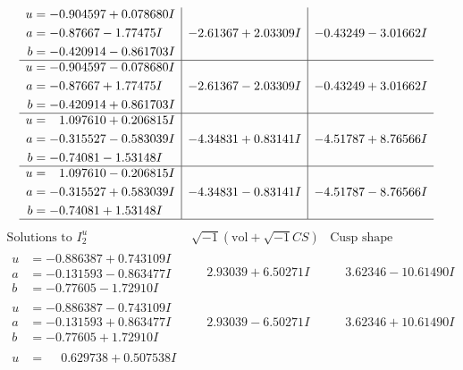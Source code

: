 \documentclass[1p]{elsarticle_modified}
\theoremstyle{definition}
\newcommand{\I}{\sqrt{-1}}
\begin{document}
$$\begin{array}{c|c|c}
\begin{aligned}
u &= -0.904597 + 0.078680 I \\
a &= -0.87667 - 1.77475 I \\
b &= -0.420914 - 0.861703 I\end{aligned}
 & -2.61367 + 2.03309 I & -0.43249 - 3.01662 I \\ \hline\begin{aligned}
u &= -0.904597 - 0.078680 I \\
a &= -0.87667 + 1.77475 I \\
b &= -0.420914 + 0.861703 I\end{aligned}
 & -2.61367 - 2.03309 I & -0.43249 + 3.01662 I \\ \hline\begin{aligned}
u &= \phantom{-}1.097610 + 0.206815 I \\
a &= -0.315527 - 0.583039 I \\
b &= -0.74081 - 1.53148 I\end{aligned}
 & -4.34831 + 0.83141 I & -4.51787 + 8.76566 I \\ \hline\begin{aligned}
u &= \phantom{-}1.097610 - 0.206815 I \\
a &= -0.315527 + 0.583039 I \\
b &= -0.74081 + 1.53148 I\end{aligned}
 & -4.34831 - 0.83141 I & -4.51787 - 8.76566 I\\
 \hline 
 \end{array}$$\newpage$$\begin{array}{c|c|c}  
\text{Solutions to }I^u_{2}& \I (\text{vol} + \sqrt{-1}CS) & \text{Cusp shape}\\
 \hline 
\begin{aligned}
u &= -0.886387 + 0.743109 I \\
a &= -0.131593 - 0.863477 I \\
b &= -0.77605 - 1.72910 I\end{aligned}
 & \phantom{-}2.93039 + 6.50271 I & \phantom{-}3.62346 - 10.61490 I \\ \hline\begin{aligned}
u &= -0.886387 - 0.743109 I \\
a &= -0.131593 + 0.863477 I \\
b &= -0.77605 + 1.72910 I\end{aligned}
 & \phantom{-}2.93039 - 6.50271 I & \phantom{-}3.62346 + 10.61490 I \\ \hline\begin{aligned}
u &= \phantom{-}0.629738 + 0.507538 I \\

\end{aligned}
\end{array}$$
\end{document}
